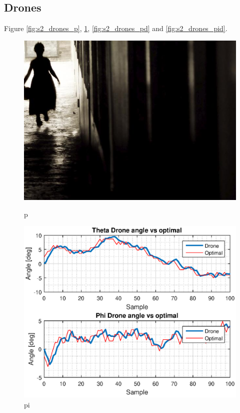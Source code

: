 \subsection{Drones}

Figure \ref{fig:s2_drones_p}, \ref{fig:s2_drones_pi}, \ref{fig:s2_drones_pd} and \ref{fig:s2_drones_pid}.
\begin{figure}[H]
\begin{minipage}[t]{0.45\textwidth}
\includegraphics[width=\linewidth]{figures/randomfigure.jpg}
\caption{p}
\label{fig:s2_drones_p}
\end{minipage}
\hspace{\fill}
\begin{minipage}[t]{0.45\textwidth}
\includegraphics[width=\linewidth]{figures/s2_pi_drone_theta_phi_optimal.eps}
\caption{pi}
\label{fig:s2_drones_pi}
\end{minipage}


\end{figure}
